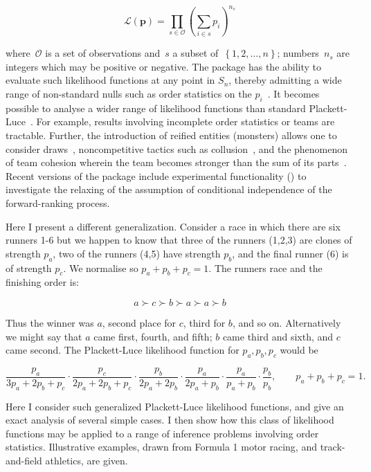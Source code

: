 \documentclass[article]{jss}
\begin{document}
\begin{equation}\label{hyper2likelihood}
\mathcal{L}\left(\mathbf{p}\right)=
\prod_{s\in \mathcal{O}}\left({\sum_{i\in s}}p_i\right)^{n_s}
\end{equation}

\noindent where~$\mathcal{O}$ is a set of observations and~$s$ a
subset of~$\left\{1,2,\ldots,n\right\}$; numbers~$n_s$ are integers
which may be positive or negative.  The  package has the
ability to evaluate such likelihood functions at any point in $S_n$,
thereby admitting a wide range of non-standard nulls such as order
statistics on the $p_i$~\citep{hankin2017}.  It becomes possible to
analyse a wider range of likelihood functions than standard
Plackett-Luce~\citep{turner2020}.  For example, results involving
incomplete order statistics or teams are tractable.  Further, the
introduction of reified entities (monsters) allows one to consider
draws~\citep{hankin2009}, noncompetitive tactics such as
collusion~\citep{hankin2020}, and the phenomenon of team cohesion
wherein the team becomes stronger than the sum of its
parts~\citep{hankin2010}.  Recent versions of the package include
experimental functionality () to investigate the
relaxing of the assumption of conditional independence of the
forward-ranking process.


Here I present a different generalization.  Consider a race in which
there are six runners 1-6 but we happen to know that three of the
runners (1,2,3) are clones of strength $p_a$, two of the runners (4,5)
have strength $p_b$, and the final runner (6) is of strength $p_c$.
We normalise so $p_a+p_b+p_c=1$.  The runners race and the finishing
order is:

$$a\succ c\succ b\succ a\succ a \succ b$$

Thus the winner was $a$, second place for $c$, third for $b$, and so
on.  Alternatively we might say that $a$ came first, fourth, and
fifth; $b$ came third and sixth, and $c$ came second.  The
Plackett-Luce likelihood function for $p_a,p_b,p_c$ would be

\begin{equation}\label{plackettluce}
\frac{p_a}{3p_a+2p_b+p_c}\cdot
\frac{p_c}{2p_a+2p_b+p_c}\cdot
\frac{p_b}{2p_a+2p_b    }\cdot
\frac{p_a}{2p_a+ p_b    }\cdot
\frac{p_a}{ p_a+ p_b    }\cdot
\frac{p_b}{      p_b    },\qquad p_a+p_b+p_c=1.
\end{equation}

Here I consider such generalized Plackett-Luce likelihood functions,
and give an exact analysis of several simple cases.  I then show how
this class of likelihood functions may be applied to a range of
inference problems involving order statistics.  Illustrative examples,
drawn from Formula 1 motor racing, and track-and-field athletics, are
given.
\end{document}
